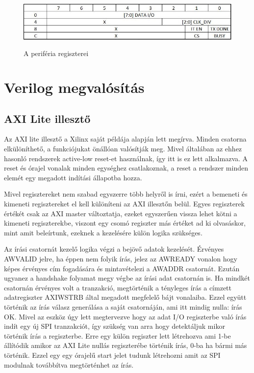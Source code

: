 \documentclass[a4paper,11pt]{article}
\begin{document}
\begin{figure}[H]
	\begin{center}
	\includegraphics[scale=1]{reg_set.JPG}
	\label{fig:registers}
	\end{center}
	\caption{A periféria regiszterei}
\end{figure}

\section{Verilog megvalósítás}

\subsection{AXI Lite illesztő}
Az AXI lite illesztő a Xilinx saját példája alapján lett megírva. Minden csatorna elkülöníthető, a funkciójukat önállóan valósítják meg. Mivel általában az ehhez hasonló rendszerek active-low reset-et használnak, így itt is ez lett alkalmazva. A reset és órajel vonalak minden egységhez csatlakoznak, a reset a rendszer minden elemét egy megadott indítási állapotba hozza.

Mivel regisztereket nem szabad egyszerre több helyről is írni, ezért a bemeneti és kimeneti regisztereket el kell különíteni az AXI illesztőn belül. Egyes regiszterek értékét csak az AXI master változtatja, ezeket egyszerűen vissza lehet kötni a kimeneti regiszterekbe, viszont egy csomó regiszter más értéket ad ki olvasáskor, mint amit beleírtunk, ezeknek a kezelésére külön logika szükséges.

Az írási csatornát kezelő logika végzi a bejövő adatok kezelését. Érvényes AWVALID jelre, ha éppen nem folyik írás, jelez az AWREADY vonalon hogy képes érvényes cím fogadására és mintavételezi a AWADDR csatornát. Ezután ugyanez a handshake folyamat megy végbe az írási adat csatornán is. Ha mindkét csatornán érvényes volt a tranzakció, megtörténik a tényleges írás a címzett adatregiszter AXI\textunderscore WSTRB által megadott megfelelő bájt vonalaiba. Ezzel együtt történik az írás válasz generálása a saját csatornáján, ami itt mindig nulla: írás OK. Mivel az eszköz úgy lett megtervezve hogy az adat I/O regiszterbe való írás indít egy új SPI tranzakciót, így szükség van arra hogy detektáljuk mikor történik írás a regiszterbe. Erre egy külön regiszter lett létrehozva ami 1-be állítódik amikor az AXI Lite nullás regiszterébe történik írás, 0-ba ha bármi más történik. Ezzel egy egy órajelű start jelet tudunk létrehozni amit az SPI modulnak továbbítva megtörténhet az írás.
\end{document}
